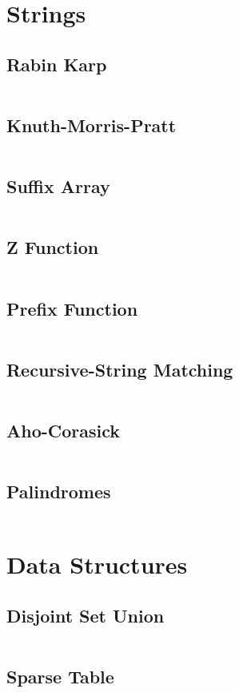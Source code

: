 \documentclass[a4paper, 10pt, twocolumn, landscape]{article}
\begin{document}
  \section{Strings}
  \subsection{Rabin Karp}
  \inputminted{cpp}{strings/rabin-karp.cpp}
  \subsection{Knuth-Morris-Pratt}
  \inputminted{cpp}{strings/kmp.cpp}
  \subsection{Suffix Array}
  \inputminted{cpp}{strings/suffix-array.cpp}
  \subsection{Z Function}
  \inputminted{cpp}{strings/z.cpp}
  \subsection{Prefix Function}
  \inputminted{cpp}{strings/prefix.cpp}
  \subsection{Recursive-String Matching}
  \inputminted{cpp}{strings/recursive-string-matching.cpp}
  \subsection{Aho-Corasick}
  \inputminted{cpp}{strings/aho.cpp}
  \subsection{Palindromes}
  \inputminted{cpp}{strings/manacher.cpp}

  \section{Data Structures}
  \subsection{Disjoint Set Union}
  \inputminted{cpp}{data-structures/dsu.cpp}
  \subsection{Sparse Table}
  \inputminted{cpp}{data-structures/sparse.cpp}
\end{document}
